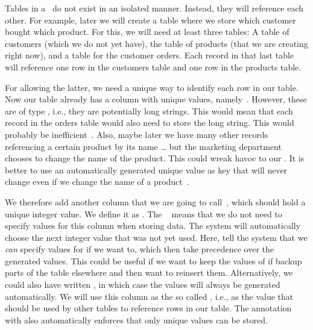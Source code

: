 Tables in a \db\ do not exist in an isolated manner.
Instead, they will reference each other.
For example, later we will create a table where we store which customer bought which product.
For this, we will need at least three tables:
A table of customers (which we do not yet have), the table of products (that we are creating right now), and a table for the customer orders.
Each record in that last table will reference one row in the customers table and one row in the products table.

For allowing the latter, we need a unique way to identify each row in our table.
Now our table already has a column with unique values, namely~.
However, these are of type , i.e., they are potentially long strings.
This would mean that each record in the orders table would also need to store the long  string.
This would probably be inefficient~\cite{M2014VPKM}.
Also, maybe later we have many other records referencing a certain product by its name {\dots} but the marketing department chooses to change the name of the product.
This could wreak havoc to our \db.
It is better to use an automatically generated unique value as key that will never change even if we change the name of a product~\cite{B2025SBPASG}.%
%
%
\begin{sloppypar}%
We therefore add another column that we are going to call~, which should hold a unique integer value.
We define it as .
The ~\cite{PGDG:PD:IC} means that we do not need to specify values for this column when storing data.
The system will automatically choose the next integer value that was not yet used.
Here,  tell the system that we \emph{can} specify values for  if we want to, which then take precedence over the generated values.
This could be useful if we want to keep the values of  if backup parts of the table elsewhere and then want to reinsert them.
Alternatively, we could also have written , in which case the  values will always be generated automatically.
We will use this column as the so called , i.e., as the value that should be used by other tables to reference rows in our  table.
The annotation with  also automatically enforces that only unique values can be stored.%
\end{sloppypar}%
